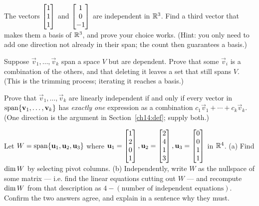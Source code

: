 \begin{exercise}
\label{ch14:exr-extend}
The vectors $\begin{bmatrix}1\\1\\1\end{bmatrix}$ and $\begin{bmatrix}1\\0\\-1\end{bmatrix}$ are independent in $\mathbb{R}^3$.
Find a third vector that makes them a basis of $\mathbb{R}^3$, and prove your choice
works. (Hint: you only need to add one direction not already in their span; the
count then guarantees a basis.)
\end{exercise}

\begin{exercise}
\label{ch14:exr-shrink}
Suppose $\vec{v}_1,\dots,\vec{v}_k$ span a space $V$ but are dependent. Prove that
some $\vec{v}_i$ is a combination of the others, and that deleting it leaves a set
that still spans $V$. (This is the trimming process; iterating it reaches a
basis.)
\end{exercise}

\begin{exercise}
\label{ch14:exr-unique}
Prove that $\vec{v}_1,\dots,\vec{v}_k$ are linearly independent if and only if
every vector in $\operatorname{span}\{\mathbf{v}_1,\dots,\mathbf{v}_k\}$ has \emph{exactly one}
expression as a combination $c_1\vec{v}_1+\cdots+c_k\vec{v}_k$. (One direction is
the argument in Section~\ref{ch14:def}; supply both.)
\end{exercise}

\begin{exercise}
\label{ch14:exr-challenge}
Let $W = \operatorname{span}\{\mathbf{u}_1,\mathbf{u}_2,\mathbf{u}_3\}$ where $\mathbf{u}_1=\begin{bmatrix}1\\2\\0\\1\end{bmatrix},
\mathbf{u}_2=\begin{bmatrix}2\\4\\1\\3\end{bmatrix},\mathbf{u}_3=\begin{bmatrix}0\\0\\1\\1\end{bmatrix}$ in $\mathbb{R}^4$. (a) Find
$\operatorname{dim} W$ by selecting pivot columns. (b) Independently, write $W$ as the
nullspace of some matrix --- i.e. find the linear equations cutting out $W$ ---
and recompute $\operatorname{dim} W$ from that description as $4 - (\text{number of independent
equations})$. Confirm the two answers agree, and explain in a sentence why they
must.
\end{exercise}

